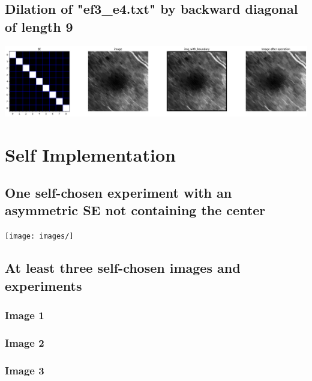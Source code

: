 \documentclass{article}
\begin{document}
\subsection{Dilation of "ef3\_e4.txt" by backward diagonal of length 9}
\includegraphics[width=\linewidth]{images/of3_o4.png}
\\ 

\section{Self Implementation}
\subsection{One self-chosen experiment with an asymmetric SE not containing the center}
\texttt{[image: images/]}
\\
\subsection{At least three self-chosen images and experiments}
\subsubsection{Image 1}
\subsubsection{Image 2}
\subsubsection{Image 3}
\end{document}
